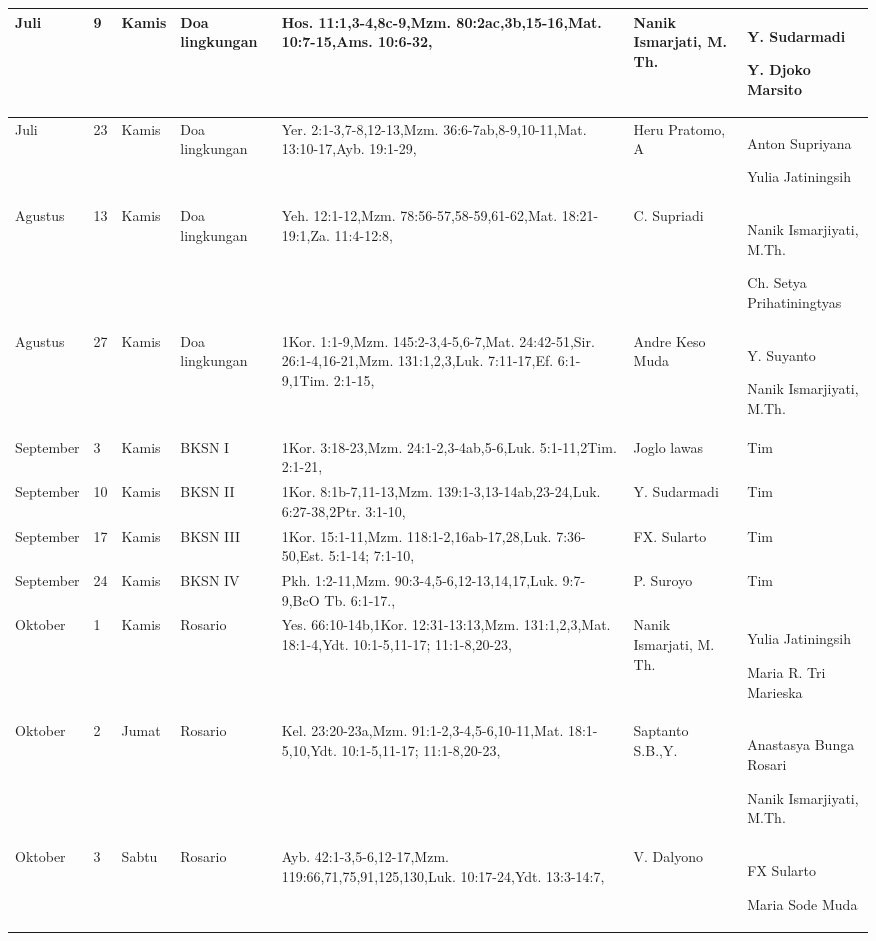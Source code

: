 \begin{flushleft}
\begin{longtable}{|m{1.2cm}|m{0.4cm}|m{0.9cm}|m{1.3cm}|>{\raggedright}m{2.5cm}|>{\raggedright}m{1.5cm}|m{2.5cm}|}
Juli&9&Kamis&Doa lingkungan&Hos. 11:1,3-4,8c-9,Mzm. 80:2ac,3b,15-16,Mat. 10:7-15,Ams. 10:6-32,&Nanik Ismarjati, M. Th.&Y. Sudarmadi\par Y. Djoko Marsito\\ \hline
Juli&23&Kamis&Doa lingkungan&Yer. 2:1-3,7-8,12-13,Mzm. 36:6-7ab,8-9,10-11,Mat. 13:10-17,Ayb. 19:1-29,&Heru Pratomo, A&Anton Supriyana\par Yulia Jatiningsih\\ \hline
Agustus&13&Kamis&Doa lingkungan&Yeh. 12:1-12,Mzm. 78:56-57,58-59,61-62,Mat. 18:21-19:1,Za. 11:4-12:8,&C. Supriadi&Nanik Ismarjiyati, M.Th.\par Ch. Setya Prihatiningtyas\\ \hline
Agustus&27&Kamis&Doa lingkungan&1Kor. 1:1-9,Mzm. 145:2-3,4-5,6-7,Mat. 24:42-51,Sir. 26:1-4,16-21,Mzm. 131:1,2,3,Luk. 7:11-17,Ef. 6:1-9,1Tim. 2:1-15,&Andre Keso Muda&Y. Suyanto\par Nanik Ismarjiyati, M.Th.\\ \hline
September&3&Kamis&BKSN I&1Kor. 3:18-23,Mzm. 24:1-2,3-4ab,5-6,Luk. 5:1-11,2Tim. 2:1-21,&Joglo lawas&Tim\par \\ \hline
September&10&Kamis&BKSN II&1Kor. 8:1b-7,11-13,Mzm. 139:1-3,13-14ab,23-24,Luk. 6:27-38,2Ptr. 3:1-10,&Y. Sudarmadi&Tim\par \\ \hline
September&17&Kamis&BKSN III&1Kor. 15:1-11,Mzm. 118:1-2,16ab-17,28,Luk. 7:36-50,Est. 5:1-14; 7:1-10,&FX. Sularto&Tim\par \\ \hline
September&24&Kamis&BKSN IV&Pkh. 1:2-11,Mzm. 90:3-4,5-6,12-13,14,17,Luk. 9:7-9,BcO Tb. 6:1-17.,&P. Suroyo&Tim\par \\ \hline
Oktober&1&Kamis&Rosario&Yes. 66:10-14b,1Kor. 12:31-13:13,Mzm. 131:1,2,3,Mat. 18:1-4,Ydt. 10:1-5,11-17; 11:1-8,20-23,&Nanik Ismarjati, M. Th.&Yulia Jatiningsih\par Maria R. Tri Marieska\\ \hline
Oktober&2&Jumat&Rosario&Kel. 23:20-23a,Mzm. 91:1-2,3-4,5-6,10-11,Mat. 18:1-5,10,Ydt. 10:1-5,11-17; 11:1-8,20-23,&Saptanto S.B.,Y.&Anastasya Bunga Rosari\par Nanik Ismarjiyati, M.Th.\\ \hline
Oktober&3&Sabtu&Rosario&Ayb. 42:1-3,5-6,12-17,Mzm. 119:66,71,75,91,125,130,Luk. 10:17-24,Ydt. 13:3-14:7,&V. Dalyono&FX Sularto\par Maria Sode Muda\\ \hline

\end{longtable}
\end{flushleft}
